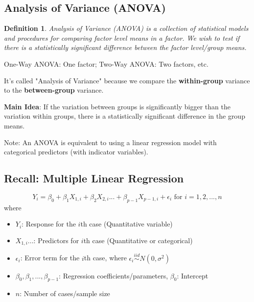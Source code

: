 \documentclass[a4paper,11pt]{article}
\newtheorem{defn}[thm]{Definition}
\begin{document}
\subsection{Analysis of Variance (ANOVA)}
\begin{defn}
\normalfont
Analysis of Variance (ANOVA) is a collection of statistical models and procedures for comparing factor level means in a factor. We wish to test if there is a statistically significant difference between the factor level/group means.
\end{defn}
One-Way ANOVA: One factor; Two-Way ANOVA: Two factors, etc.

It's called "Analysis of Variance" because we compare the \textbf{within-group} variance to the \textbf{between-group} variance. 

\textbf{Main Idea}: If the variation between groups is significantly bigger than the variation within groups, there is a statistically significant difference in the group means. 

Note: An ANOVA is equivalent to using a linear regression model with categorical predictors (with indicator variables).

\subsection{Recall: Multiple Linear Regression}
$$Y_i=\beta_0+\beta_1X_{1,i}+\beta_2X_{2,i}...+\beta_{p-1}X_{p-1,i}+\epsilon_i\text{ for }i=1,2,...,n$$
where
\begin{itemize}
\item $Y_i$: Response for the $i$th case (Quantitative variable)
\item $X_{1,i}...$: Predictors for $i$th case (Quantitative or categorical)
\item $\epsilon_i$: Error term for the $i$th case, where $\epsilon_i\stackrel{iid}{\sim}N(0, \sigma^2)$
\item $\beta_0, \beta_1, ..., \beta_{p-1}$: Regression coefficients/parameters, $\beta_0$: Intercept
\item $n$: Number of cases/sample size
\end{itemize}
\end{document}
